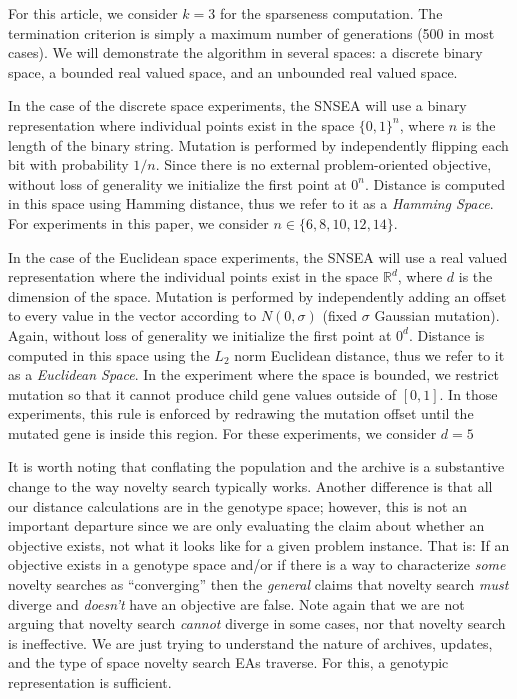 \documentclass[twoside]{article}
\newcommand{\IR}{\mathbb{R}}
\begin{document}
For this article, we consider $k=3$ for the sparseness computation.  The termination criterion is simply a maximum number of generations (500 in most cases).  We will demonstrate the algorithm in several spaces: a discrete binary space, a bounded real valued space, and an unbounded real valued space.  

In the case of the discrete space experiments, the SNSEA will use a binary representation where individual points exist in the space $\{0,1\}^n$, where $n$ is the length of the binary string.  Mutation is performed by independently flipping each bit with probability $1/n$.  Since there is no external problem-oriented objective, without loss of generality we initialize the first point at $0^n$.  Distance is computed in this space using Hamming distance, thus we refer to it as a \emph{Hamming Space}.  For experiments in this paper, we consider $n\in\{6,8,10,12,14\}$.

In the case of the Euclidean space experiments, the SNSEA will use a real valued representation where the individual points exist in the space $\IR^d$, where $d$ is the dimension of the space.  Mutation is performed by independently adding an offset to every value in the vector according to $N(0,\sigma)$ (fixed $\sigma$ Gaussian mutation).  Again, without loss of generality we initialize the first point at $0^d$.  Distance is computed in this space using the $L_2$ norm Euclidean distance, thus we refer to it as a \emph{Euclidean Space}.  In the experiment where the space is bounded, we restrict mutation so that it cannot produce child gene values outside of $[0,1]$.  In those experiments, this rule is enforced by redrawing the mutation offset until the mutated gene is inside this region.  For these experiments, we consider $d=5$

It is worth noting that conflating the population and the archive is a substantive change to the way novelty search typically works.  Another difference is that all our distance calculations are in the genotype space; however, this is not an important departure since we are only evaluating the claim about whether an objective exists, not what it looks like for a given problem instance.  That is:  If an objective exists in a genotype space and/or if there is a way to characterize \emph{some} novelty searches as ``converging'' then the \emph{general} claims that novelty search \emph{must} diverge and \emph{doesn't} have an objective are false.  Note again that we are not arguing that novelty search \emph{cannot} diverge in some cases, nor that novelty search is ineffective.  We are just trying to understand the nature of archives, updates, and the type of space novelty search EAs traverse.  For this, a genotypic representation is sufficient.
\end{document}
